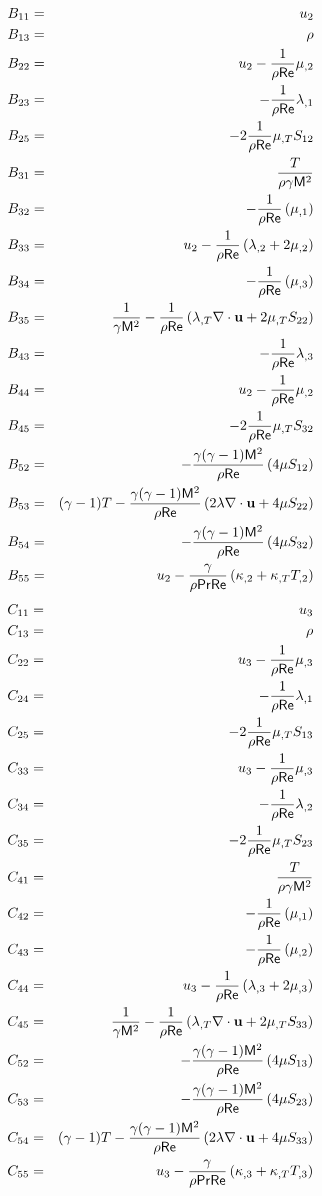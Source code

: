 \begin{eqnarray} 
  B_{11} &=&  u_2 \\
  B_{13} &=& \rho \\
%
  B_{22} &=&  u_2 - \fact\mu_{,2}  \\
  B_{23} &=& -\fact\lambda_{,1}\\
  B_{25} &=& -2\fact\dmu S_{12} \\
%
  B_{31} &=& \frac{ T}{\rho\gamma \M^2} \\
  B_{32} &=& -\fact\left(\mu_{,1}\right) \\
  B_{33} &=&  u_2 -\fact\left(\lambda_{,2} + 
             2 \mu_{,2}\right) \\
  B_{34} &=& -\fact\left(\mu_{,3}\right) \\
  B_{35} &=& \frac{1}{\gamma \M^2} - 
             \fact\left(\dlm \divu + 2 \dmu  S_{22} \right ) \\
%
  B_{43} &=& -\fact\lambda_{,3} \\
  B_{44} &=&  u_2 -\fact\mu_{,2} \\
  B_{45} &=& -2\fact\dmu S_{32} \\
%
  B_{52} &=& -\ff\left(4\mu S_{12}\right) \\
  B_{53} &=& \gammam T - \ff\left(2\lambda\divu + 4\mu S_{22}\right) \\
  B_{54} &=& -\ff\left(4\mu S_{32}\right) \\
  B_{55} &=&  u_2  - 
             \frac{\gamma}{\rho\Pr\Re}\left( \kappa_{,2} + 
             \dcon  T_{,2} \right)
\end{eqnarray}
\bigskip
{}
%
\begin{eqnarray} 
  C_{11} &=&  u_3 \\
  C_{13} &=& \rho \\
%
  C_{22} &=&  u_3 - \fact\mu_{,3}  \\
  C_{24} &=& -\fact\lambda_{,1}\\
  C_{25} &=& -2\fact\dmu S_{13} \\
%
  C_{33} &=&  u_3 -\fact\mu_{,3} \\
  C_{34} &=& -\fact\lambda_{,2} \\
  C_{35} &=& -2\fact\dmu S_{23} \\
%
  C_{41} &=& \frac{ T}{\rho\gamma \M^2} \\
  C_{42} &=& -\fact\left(\mu_{,1}\right) \\
  C_{43} &=& -\fact\left(\mu_{,2}\right) \\
  C_{44} &=&  u_3 -\fact\left(\lambda_{,3} + 
             2\mu_{,3}\right) \\
  C_{45} &=& \frac{1}{\gamma \M^2} - 
             \fact\left(\dlm \divu + 2\dmu S_{33} \right ) \\
%
  C_{52} &=& -\ff\left(4\mu S_{13}\right) \\
  C_{53} &=& -\ff\left(4\mu S_{23}\right) \\
  C_{54} &=& \gammam T - \ff\left(2\lambda\divu + 4\mu S_{33}\right) \\
  C_{55} &=&  u_3 - 
             \frac{\gamma}{\rho\Pr\Re}\left( \kappa_{,3} + 
             \dcon  T_{,3} \right)
\end{eqnarray}
